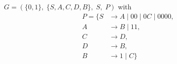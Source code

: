 \documentclass{article}
\begin{document}
$G=\left(\{0, 1\},\;\{ S, A, C, D, B\},\;S,\;P\right)$ with
\begin{align*}
P=\{	S &\rightarrow A\;|\;00\;|\;0C\;|\;0000, \\ 
	A &\rightarrow B\;|\;11, \\ 
	C &\rightarrow D, \\ 
	D &\rightarrow B, \\ 
	B &\rightarrow 1\;|\;C\}
\end{align*}
\end{document}
